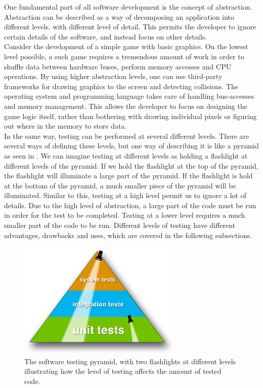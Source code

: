 
\label{sec:theory_levels}

One fundamental part of all software development is the concept of
abstraction. Abstraction can be described as a way of decomposing an
application into different levels, with different level of detail. This
permits the developer to ignore certain details of the software, and
instead focus on other details.\\

Consider the development of a simple game with basic graphics. On the
lowest level possible, a such game requires a tremendous amount of work
in order to shuffle data between hardware buses, perform memory accesses
and CPU operations. By using higher abstraction levels, one can use
third-party frameworks for drawing graphics to the screen and detecting
collisions. The operating system and programming language takes care of
handling bus-accesses and memory management. This allows the developer
to focus on designing the game logic itself, rather than bothering with
drawing individual pixels or figuring out where in the memory to store
data. \cite{paper:abstraction}\\

In the same way, testing can be performed at several different levels.
There are several ways of defining these levels, but one way of
describing it is like a pyramid as seen in .
We can imagine testing at different levels as holding a flashlight at
different levels of the pyramid. If we hold the flashlight at the top of
the pyramid, the flashlight will illuminate a large part of the pyramid.
If the flashlight is hold at the bottom of the pyramid, a much smaller
piece of the pyramid will be illuminated. Similar to this, testing at a
high level permit us to ignore a lot of details. Due to the high level
of abstraction, a large part of the code must be run in order for the
test to be completed. Testing at a lower level requires a much smaller
part of the code to be run. Different levels of testing have different
advantages, drawbacks and uses, which are covered in the following
subsections.\\

\begin{figure}
\centering
\includegraphics[width=0.7\textwidth]{theory/levels/triangle}
\caption{The software testing pyramid, with two flashlights at different
         levels illustrating how the level of testing affects the amount
         of tested code.}
\label{fig:testing_pyramid}
\end{figure}
